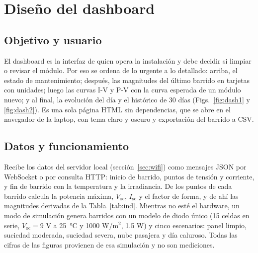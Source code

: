 \documentclass[10pt,letterpaper,twocolumn]{article}
\begin{document}
\section{Diseño del dashboard}\label{sec:dash}
\subsection{Objetivo y usuario}
El dashboard es la interfaz de quien opera la instalación y debe decidir si limpiar o revisar el módulo. Por eso se ordena de lo urgente a lo detallado: arriba, el estado de mantenimiento; después, las magnitudes del último barrido en tarjetas con unidades; luego las curvas I-V y P-V con la curva esperada de un módulo nuevo; y al final, la evolución del día y el histórico de 30 días (Figs.~\ref{fig:dash1} y \ref{fig:dash2}). Es una sola página HTML sin dependencias, que se abre en el navegador de la laptop, con tema claro y oscuro y exportación del barrido a CSV.

\subsection{Datos y funcionamiento}
Recibe los datos del servidor local (sección~\ref{sec:wifi}) como mensajes JSON por WebSocket o por consulta HTTP: inicio de barrido, puntos de tensión y corriente, y fin de barrido con la temperatura y la irradiancia. De los puntos de cada barrido calcula la potencia máxima, $V_\mathrm{oc}$, $I_\mathrm{sc}$ y el factor de forma, y de ahí las magnitudes derivadas de la Tabla~\ref{tab:ind}. Mientras no esté el hardware, un modo de simulación genera barridos con un modelo de diodo único (15 celdas en serie, $V_\mathrm{oc}=9$ V a 25~°C y 1000 W/m$^2$, 1.5 W) y cinco escenarios: panel limpio, suciedad moderada, suciedad severa, nube pasajera y día caluroso. Todas las cifras de las figuras provienen de esa simulación y no son mediciones.
\end{document}
